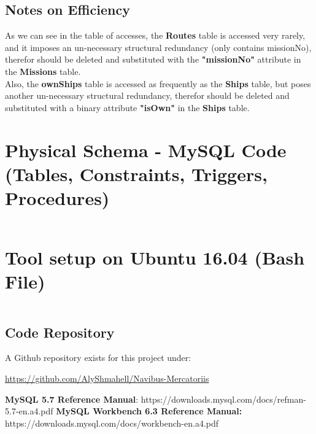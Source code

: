 \documentclass[12pt]{scrartcl}
\begin{document}
\subsection*{Notes on Efficiency}
As we can see in the table of accesses, the \textbf{Routes} table is accessed very rarely, and it imposes an un-necessary structural redundancy (only contains missionNo), therefor should be deleted and substituted with the \textbf{"missionNo"} attribute in the \textbf{Missions} table.\\

Also, the \textbf{ownShips} table is accessed as frequently as the \textbf{Ships} table, but poses another un-necessary structural redundancy, therefor should be deleted and substituted with a binary attribute \textbf{"isOwn"} in the \textbf{Ships} table.
\newpage
\section*{Physical Schema - MySQL Code (Tables, Constraints, Triggers, Procedures)}
\inputminted[breaklines=true, fontsize=\footnotesize]{mysql}{mercantileShips.sql}
\newpage
\section*{Tool setup on Ubuntu 16.04 (Bash File)}
\inputminted[breaklines=true, fontsize=\footnotesize]{bash}{setup.sh}
\newpage
\begin{flushleft}
	\section*{\textbf{Code Repository}}
\end{flushleft}
\begin{flushleft}
	A Github repository exists for this project under:\\
\end{flushleft}
	\begin{center}
		\url{https://github.com/AlyShmahell/Navibus-Mercatoriis}
	\end{center}
\begin{thebibliography}{}
\textbf{MySQL 5.7 Reference Manual}: https://downloads.mysql.com/docs/refman-5.7-en.a4.pdf
\textbf{MySQL Workbench 6.3 Reference Manual:} https://downloads.mysql.com/docs/workbench-en.a4.pdf
\end{thebibliography}
\end{document}
